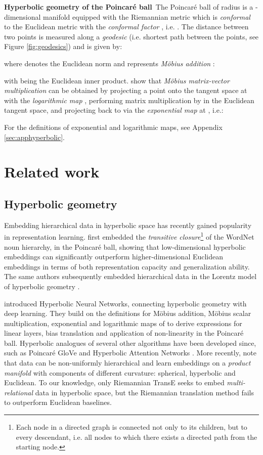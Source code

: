 \documentclass{article}
\newcommand{\keypoint}[1]{\vspace{0.cm}\noindent\textbf{#1}\,}
\begin{document}
\keypoint{Hyperbolic geometry of the Poincar{\'e} ball} The Poincar{\'e} ball  of radius  is a -dimensional manifold  equipped with the Riemannian metric  which is \textit{conformal} to the Euclidean metric  with the \textit{conformal factor} , i.e. . The distance between two points  is measured along a \textit{geodesic} (i.e. shortest path between the points, see Figure \ref{fig:geodesics}) and is given by:

where  denotes the Euclidean norm and  represents \textit{Möbius addition} \citep{ungar2001hyperbolic}:

with  being the Euclidean inner product. \citet{ganea2018hyperbolic} show that \textit{Möbius matrix-vector multiplication} can be obtained by projecting a point  onto the tangent space at  with the \textit{logarithmic map} , performing matrix multiplication by  in the Euclidean tangent space, and projecting back to  via the \textit{exponential map} at , i.e.:


For the definitions of exponential and logarithmic maps, see Appendix \ref{sec:apphyperbolic}. 


\section{Related work}
\subsection{Hyperbolic geometry}

Embedding hierarchical data in hyperbolic space has recently gained popularity in representation learning. \citet{nickel2017poincare} first embedded the \textit{transitive closure}\footnote{Each node in a directed graph is connected not only to its children, but to every descendant, i.e. all nodes to which there exists a directed path from the starting node.} of the WordNet noun hierarchy, in the Poincar{\'e} ball, showing that low-dimensional hyperbolic embeddings can significantly outperform higher-dimensional Euclidean embeddings in terms of both representation capacity and generalization ability. The same authors subsequently embedded hierarchical data in the Lorentz model of hyperbolic geometry \cite{nickel2018learning}. 

\citet{ganea2018hyperbolic} introduced Hyperbolic Neural Networks, connecting hyperbolic geometry with deep learning. They build on the definitions for Möbius addition, Möbius scalar multiplication, exponential and logarithmic maps of \citet{ungar2001hyperbolic} to derive expressions for linear layers, bias translation and application of non-linearity in the Poincar{\'e} ball. Hyperbolic analogues of several other algorithms have been developed since, such as Poincar{\'e} GloVe \cite{tifrea2019poincare} and Hyperbolic Attention Networks \cite{gulcehre2019hyperbolic}. More recently, \citet{gu2019learning} note that data can be non-uniformly hierarchical and learn embeddings on a \textit{product manifold} with components of different curvature: spherical, hyperbolic and Euclidean.
To our knowledge, only Riemannian TransE \cite{suzuki2019riemannian} seeks to embed \textit{multi-relational} data in hyperbolic space, but the Riemannian translation method fails to outperform Euclidean baselines.
\end{document}
